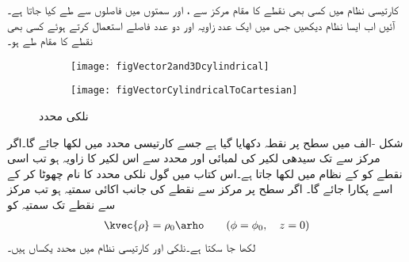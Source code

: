 کارتیسی نظام میں کسی بھی نقطے کا مقام مرکز سے ،  اور  سمتوں میں فاصلوں سے طے کیا جاتا ہے۔آئیں اب ایسا نظام دیکھیں جس میں ایک عدد زاویہ اور دو عدد فاصلے استعمال کرتے ہوئے کسی بھی نقطے کا مقام طے ہو۔
 \begin{figure}
\centering
\begin{subfigure}{0.4\textwidth}
\centering
\texttt{[image: figVector2and3Dcylindrical]}
\end{subfigure}%
%
\begin{subfigure}{0.4\textwidth}
\centering
\texttt{[image: figVectorCylindricalToCartesian]}
\end{subfigure}%
\caption{نلکی محدد}
\label{شکل_سمتیہ_نلکی_محدد}
\end{figure}

شکل -الف میں  سطح پر نقطہ  دکھایا گیا ہے جسے کارتیسی محدد میں  لکھا جائے گا۔اگر مرکز سے  تک سیدھی لکیر کی لمبائی  اور  محدد سے اس لکیر کا زاویہ  ہو تب اسی نقطے
 کو  کے نظام میں  لکھا جاتا ہے۔اس کتاب میں گول نلکی محدد کا نام چھوٹا کر کے اسے  پکارا جائے گا۔ اگر  سطح پر مرکز سے نقطے کی جانب اکائی سمتیہ  ہو تب مرکز سے نقطے تک سمتیہ کو
\begin{align}
\kvec{\rho}=\rho_0 \arho \quad \quad (\phi=\phi_0, \quad   z=0 )
\end{align}
   لکھا جا سکتا ہے۔نلکی  اور کارتیسی نظام میں   محدد یکساں ہیں۔

